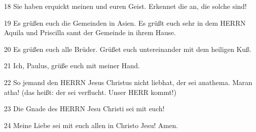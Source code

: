 \par 18 Sie haben erquickt meinen und euren Geist. Erkennet die an, die solche sind!
\par 19 Es grüßen euch die Gemeinden in Asien. Es grüßt euch sehr in dem HERRN Aquila und Priscilla samt der Gemeinde in ihrem Hause.
\par 20 Es grüßen euch alle Brüder. Grüßet euch untereinander mit dem heiligen Kuß.
\par 21 Ich, Paulus, grüße euch mit meiner Hand.
\par 22 So jemand den HERRN Jesus Christus nicht liebhat, der sei anathema. Maran atha! (das heißt: der sei verflucht. Unser HERR kommt!)
\par 23 Die Gnade des HERRN Jesu Christi sei mit euch!
\par 24 Meine Liebe sei mit euch allen in Christo Jesu! Amen.

